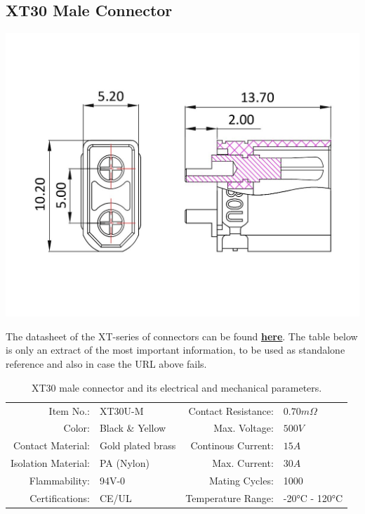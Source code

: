 \clearpage %
    
\subsection{XT30 Male Connector}

\includegraphics[width=\textwidth]{contents/figures/xt30_m.jpg}

The datasheet of the XT-series of connectors can be found \href{https://www.lcsc.com/datasheet/lcsc_datasheet_2304140030_Changzhou-Amass-Elec-XT30U-F_C99101.pdf}{\textbf{\underline{here}}}.
The table below is only an extract of the most important information, to be used as standalone reference and also in case the URL above fails.

\begin{table}[h] %
    \begin{tabular}{rlrl}
         Item No.:&  XT30U-M &  Contact Resistance:& $0.70m \Omega$\\
         Color:&  Black \& Yellow&  Max. Voltage:& $500V$\\
         Contact Material:&  Gold plated brass&  Continous Current:& $15A$\\
         Isolation Material:&  PA (Nylon)&  Max. Current:& $30A$\\
         Flammability:&  94V-0&  Mating Cycles:& 1000\\
         Certifications:&  CE/UL&  Temperature Range:& -20°C - 120°C\\
    \end{tabular}
    \caption{XT30 male connector and its electrical and mechanical parameters.}
    \label{xt30_m_specs}
\end{table}

